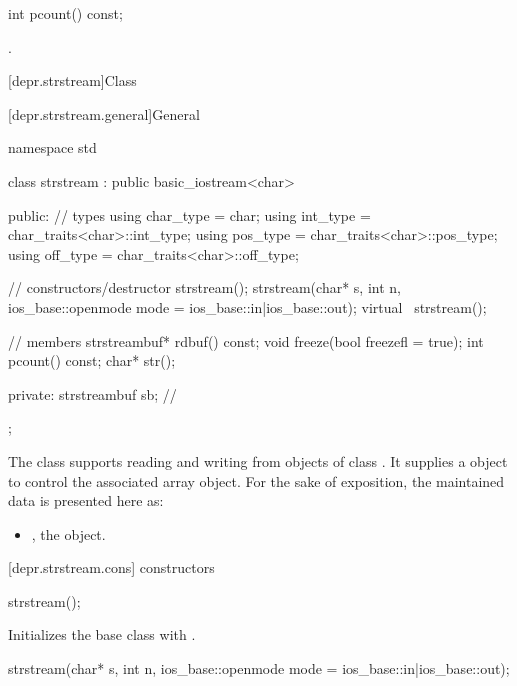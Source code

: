 %
\begin{itemdecl}
int pcount() const;
\end{itemdecl}

\begin{itemdescr}
\pnum
\returns
{}.
\end{itemdescr}

[depr.strstream]{Class }

[depr.strstream.general]{General}

%
\begin{codeblock}
namespace std {
  class strstream
    : public basic_iostream<char> {
  public:
    // types
    using char_type = char;
    using int_type  = char_traits<char>::int_type;
    using pos_type  = char_traits<char>::pos_type;
    using off_type  = char_traits<char>::off_type;

    // constructors/destructor
    strstream();
    strstream(char* s, int n,
              ios_base::openmode mode = ios_base::in|ios_base::out);
    virtual ~strstream();

    // members
    strstreambuf* rdbuf() const;
    void freeze(bool freezefl = true);
    int pcount() const;
    char* str();

  private:
    strstreambuf sb;            // \expos
  };
}
\end{codeblock}

\pnum
The class
supports reading and writing from objects of class
.
It supplies a
object to control the associated array object.
For the sake of exposition, the maintained data is presented here as:
\begin{itemize}
\item
{}, the  object.
\end{itemize}

[depr.strstream.cons]{ constructors}

%
\begin{itemdecl}
strstream();
\end{itemdecl}

\begin{itemdescr}
\pnum
\effects
Initializes the base class with .
\end{itemdescr}

%
\begin{itemdecl}
strstream(char* s, int n,
          ios_base::openmode mode = ios_base::in|ios_base::out);
\end{itemdecl}

